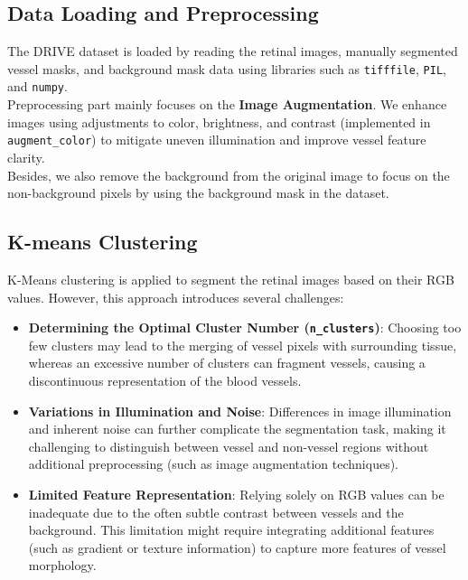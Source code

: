 \documentclass[12pt,letterpaper]{article}
\begin{document}
\subsection{Data Loading and Preprocessing}
The DRIVE dataset is loaded by reading the retinal images, manually segmented vessel masks, and background mask data using libraries such as \texttt{tifffile}, \texttt{PIL}, and \texttt{numpy}. \\
Preprocessing part mainly focuses on the \textbf{Image Augmentation}. We enhance images using adjustments to color, brightness, and contrast (implemented in \texttt{augment\_color}) to mitigate uneven illumination and improve vessel feature clarity. \\
Besides, we also remove the background from the original image to focus on the non-background pixels by using the background mask in the dataset. 
\subsection{K-means Clustering}
K-Means clustering is applied to segment the retinal images based on their RGB values. However, this approach introduces several challenges:
\begin{itemize}
    \item \textbf{Determining the Optimal Cluster Number (\texttt{n\_clusters})}: Choosing too few clusters may lead to the merging of vessel pixels with surrounding tissue, whereas an excessive number of clusters can fragment vessels, causing a discontinuous representation of the blood vessels.
    \item \textbf{Variations in Illumination and Noise}: Differences in image illumination and inherent noise can further complicate the segmentation task, making it challenging to distinguish between vessel and non-vessel regions without additional preprocessing (such as image augmentation techniques).
    \item \textbf{Limited Feature Representation}: Relying solely on RGB values can be inadequate due to the often subtle contrast between vessels and the background. This limitation might require integrating additional features (such as gradient or texture information) to capture more features of vessel morphology.
\end{itemize}
\end{document}
